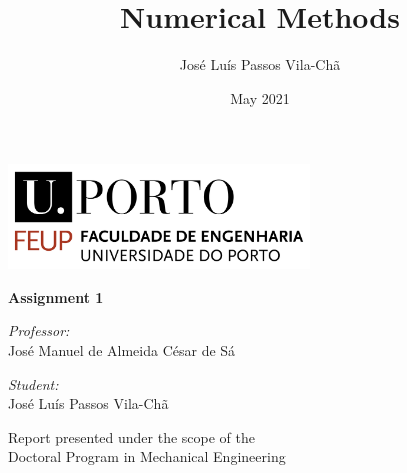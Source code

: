\documentclass[a4paper, openright, twoside]{report}
\title{Numerical Methods}
\author{José Luís Passos Vila-Chã}
\date{May 2021}
\begin{document}
\begin{titlepage}
\thispagestyle{firststyle}
\begin{center}
   \begin{minipage}[c][10cm][l]{0.9\textwidth}

        \includegraphics[width=0.6\textwidth]{figures/university}

        \vspace{3.5cm}
        \huge
       \textbf{Assignment 1}

       \vspace{1.5cm}
        \small
       \textit{Professor:}\\
       \normalsize
       José Manuel de Almeida César de Sá 	\\

       \vspace{0.5cm}


         \small
        \textit{Student:}\\
        \vspace{0.5cm}
       \normalsize
       \!José Luís Passos Vila-Chã
       \vspace{8cm}


        \centering
       \small
       Report presented under the scope of the\\ Doctoral Program in Mechanical Engineering

   \end{minipage}
   \end{center}
\end{titlepage}

\newpage\null\thispagestyle{blank}\newpage

\setcounter{tocdepth}{2}
\tableofcontents


\listoffigures


\listoftables

\newpage\null\thispagestyle{blank}\newpage

\pagestyle{fancy}







\appendix



\end{document}
